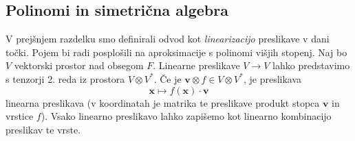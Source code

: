 \documentclass{article}
\newcommand{\x}{\mathbf{x}}
\newcommand{\vv}{\mathbf{v}}
\begin{document}
\subsection{Polinomi in simetrična algebra}
V prejšnjem razdelku smo definirali odvod kot \emph{linearizacijo} preslikave v dani
točki. Pojem bi radi posplošili na aproksimacije s polinomi višjih stopenj.  
 Naj bo $V$ vektorski prostor nad obsegom $F$. Linearne preslikave $V\to V$
 lahko predstavimo s tenzorji 2. reda iz prostora $V\otimes V^*$. Če je
 $\vv\otimes f\in V\otimes V^*$, je preslikava
 \begin{equation}
   \label{eq:lin_tenzor}
   \x \mapsto f(\x)\cdot \vv
 \end{equation}
linearna preslikava (v koordinatah je matrika te preslikave produkt stopca $\vv$
in vrstice $f$). Vsako linearno preslikavo lahko zapišemo kot linearno
kombinacijo preslikav te vrste.
\end{document}

